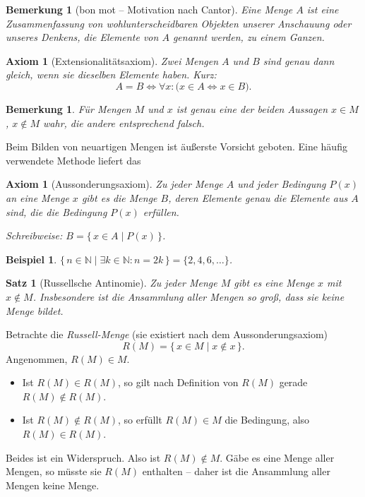 \documentclass[a4paper]{article}
\makeatletter
\theoremstyle{kurzskript}
\newtheorem{bemerkung}[satz]{Bemerkung}
\newtheorem{axiom}[satz]{Axiom}
\newtheorem*{axiomohne}{Axiom}
\newtheorem*{satzohne}{Satz}
\newtheorem*{bsp}{Beispiel}
\newtheorem*{bem}{Bemerkung}
\renewenvironment{proof}[1][\proofname]{\par\pushQED{\qed}%
  \normalfont\topsep\medskipamount\relax
  \trivlist\item[\hskip\labelsep\bfseries #1\@addpunct{.}]\ignorespaces}%
  {\popQED\endtrivlist\@endpefalse}
\renewcommand{\proofname}{Beweis}
\newcommand{\N}{\mathbb{N}}
\makeatother
\begin{document}
\begin{bemerkung}[\glqq bon mot\grqq{} -- Motivation nach Cantor]
Eine \emph{Menge} $A$ ist eine Zusammenfassung von wohlunterscheidbaren Objekten unserer Anschauung oder unseres Denkens, die \emph{Elemente} von $A$ genannt werden, zu einem Ganzen.
\end{bemerkung}

\begin{axiom}[Extensionalitätsaxiom]
Zwei Mengen $A$ und $B$ sind genau dann gleich, wenn sie dieselben Elemente haben. Kurz:
\[
  A = B \iff \forall x: \bigl(x \in A \iff x \in B\bigr).
\]
\end{axiom}

\begin{bem}
Für Mengen $M$ und $x$ ist genau eine der beiden Aussagen $x \in M$, $x \notin M$ wahr, die andere entsprechend falsch.
\end{bem}

Beim Bilden von \glqq neuartigen\grqq{} Mengen ist äußerste Vorsicht geboten. Eine häufig verwendete Methode liefert das

\begin{axiomohne}[Aussonderungsaxiom]
Zu jeder Menge $A$ und jeder Bedingung $P(x)$ an eine Menge $x$ gibt es die Menge $B$, deren Elemente genau die Elemente aus $A$ sind, die die Bedingung $P(x)$ erfüllen.

\emph{Schreibweise:} $B = \{\, x \in A \mid P(x) \,\}$.
\end{axiomohne}

\begin{bsp}
$\{\, n \in \N \mid \exists k \in \N : n = 2k \,\} = \{2, 4, 6, \dots\}$.
\end{bsp}

\begin{satzohne}[Russellsche Antinomie]
Zu jeder Menge $M$ gibt es eine Menge $x$ mit $x \notin M$. Insbesondere ist die Ansammlung aller Mengen so groß, dass sie \emph{keine} Menge bildet.
\end{satzohne}

\begin{proof}
Betrachte die \emph{Russell-Menge} (sie existiert nach dem Aussonderungsaxiom)
\[
  R(M) = \{\, x \in M \mid x \notin x \,\}.
\]
Angenommen, $R(M) \in M$.
\begin{itemize}
  \item Ist $R(M) \in R(M)$, so gilt nach Definition von $R(M)$ gerade $R(M) \notin R(M)$.
  \item Ist $R(M) \notin R(M)$, so erfüllt $R(M) \in M$ die Bedingung, also $R(M) \in R(M)$.
\end{itemize}
Beides ist ein Widerspruch. Also ist $R(M) \notin M$. Gäbe es eine Menge aller Mengen, so müsste sie $R(M)$ enthalten -- daher ist die Ansammlung aller Mengen keine Menge.
\end{proof}
\end{document}
